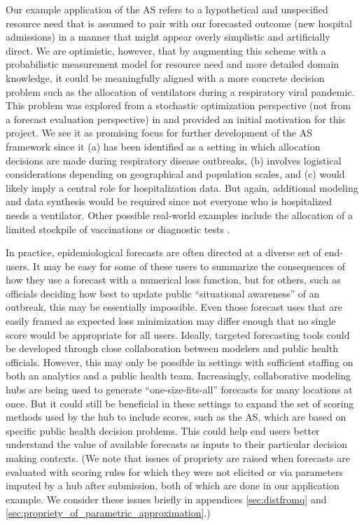 \documentclass{article}\usepackage[]{graphicx}\usepackage[]{xcolor}
\begin{document}
Our example application of the AS refers to a hypothetical and unspecified resource need that is assumed to pair with
our forecasted outcome (new hospital admissions) in a manner that might appear overly simplistic and artificially
direct.  We are optimistic, however, that by augmenting this scheme with a probabilistic measurement model for resource
need and more detailed domain knowledge, it could be meaningfully aligned with a more concrete decision problem such as
the allocation of ventilators during a respiratory viral pandemic.  This problem was explored from a stochastic
optimization perspective (not from a forecast evaluation perspective) in \cite{huang_stockpiling_2017} and provided an
initial motivation for this project. We see it as promising focus for further development of the AS framework since it
(a) has been identified as a setting in which allocation decisions are made during respiratory disease outbreaks, (b) involves
logistical considerations depending on geographical and population scales, and (c) would likely imply a central role for
hospitalization data. But again, additional modeling and data synthesis would be required since not everyone who is
hospitalized needs a ventilator. Other possible real-world examples include the allocation of a limited stockpile of
vaccinations \citep{araz_geographic_2012,persad_fair_2023} or diagnostic tests
\citep{du_optimal_2022,pasco_covid-19_2023}.

In practice, epidemiological forecasts are often directed at a diverse set of end-users. It may be easy for some of
these users to summarize the consequences of how they use a forecast with a numerical loss function, but for others,
such as officials deciding how best to update public ``situational awareness'' of an outbreak, this may be essentially
impossible. Even those forecast uses that are easily framed as expected loss minimization may differ enough that no
single score would be appropriate for all users. Ideally, targeted forecasting tools could be developed through close
collaboration between modelers and public health officials. However, this may only be possible in settings with
sufficient staffing on both an analytics and a public health team. Increasingly, collaborative modeling hubs are being
used to generate ``one-size-fits-all'' forecasts for many locations at once. But it could still be beneficial in these
settings to expand the set of scoring methods used by the hub to include scores, such as the AS, which are based on
specific public health decision problems.  This could help end users better understand the value of available forecasts
as inputs to their particular decision making contexts. (We note that issues of propriety are raised when forecasts are
evaluated with scoring rules for which they were not elicited or via parameters imputed by a hub after submission, both
of which are done in our application example.  We consider these issues briefly in appendices
\ref{sec:distfromq} and \ref{sec:propriety_of_parametric_approximation}.)
\end{document}
